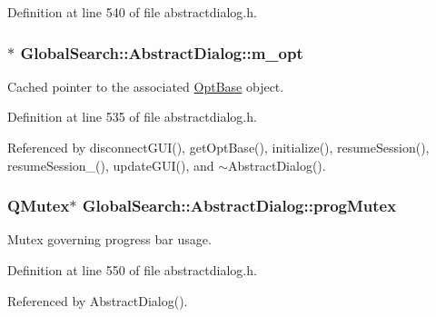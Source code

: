 Definition at line 540 of file abstractdialog.\+h.

\hypertarget{classGlobalSearch_1_1AbstractDialog_a6a5b08f59d1521ebc4769e9e9903346b}{}
\subsubsection[{m\+\_\+opt}]{$\ast$ Global\+Search\+::\+Abstract\+Dialog\+::m\+\_\+opt\hspace{0.3cm}{\ttfamily [protected]}}\label{classGlobalSearch_1_1AbstractDialog_a6a5b08f59d1521ebc4769e9e9903346b}
Cached pointer to the associated \hyperlink{classGlobalSearch_1_1OptBase}{Opt\+Base} object. 

Definition at line 535 of file abstractdialog.\+h.



Referenced by disconnect\+G\+U\+I(), get\+Opt\+Base(), initialize(), resume\+Session(), resume\+Session\+\_\+(), update\+G\+U\+I(), and $\sim$\+Abstract\+Dialog().

\hypertarget{classGlobalSearch_1_1AbstractDialog_a06e3b73c319208a706aaf629a5f05165}{}
\subsubsection[{prog\+Mutex}]{\setlength{\rightskip}{0pt plus 5cm}Q\+Mutex$\ast$ Global\+Search\+::\+Abstract\+Dialog\+::prog\+Mutex\hspace{0.3cm}{\ttfamily [protected]}}\label{classGlobalSearch_1_1AbstractDialog_a06e3b73c319208a706aaf629a5f05165}
Mutex governing progress bar usage. 

Definition at line 550 of file abstractdialog.\+h.



Referenced by Abstract\+Dialog().

\hypertarget{classGlobalSearch_1_1AbstractDialog_a1cf317e8206fd80628a9fe6d2ec711fc}{}
